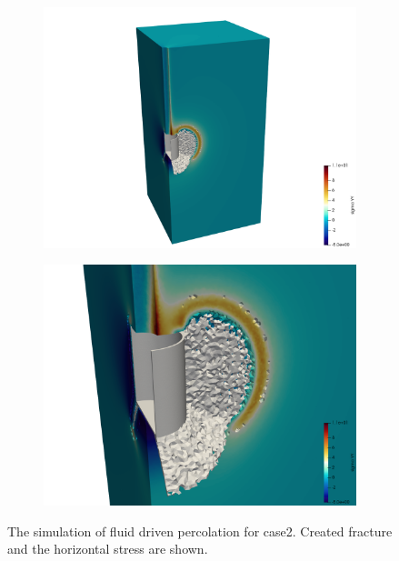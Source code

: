 \begin{figure}[!ht]
\begin{subfigure}[c]{0.48\textwidth}
\includegraphics[width=1\textwidth]{figures/Keita_ME2_case2.png}
\subcaption{}
\label{fig:Keita_ME2_VPF_case2_zoomout}
\end{subfigure}
\hfill
\begin{subfigure}[c]{0.48\textwidth}
\includegraphics[width=1\textwidth]{figures/Keita_ME2_case2_zoomin.png}
\subcaption{}
\label{fig:Keita_ME2_VPF_case2_zeemin}
\end{subfigure}
\caption{The simulation of fluid driven percolation for case2. Created fracture and the horizontal stress are shown.}
\label{fig:Keita_ME2_VPF_case2}
\end{figure}

